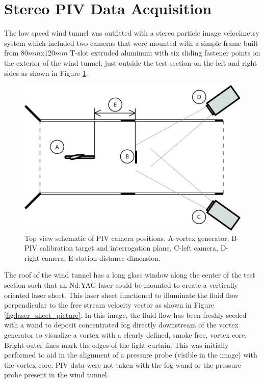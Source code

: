 

\section{Stereo PIV Data Acquisition}

The low speed wind tunnel was outfitted with a stereo particle image 
velocimetry system which included two cameras that were mounted with a simple 
frame built from 80$mm$x120$mm$ T-slot extruded aluminum with six sliding 
fastener points on the exterior of the wind tunnel, just outside the test 
section on the left and right sides as shown in Figure \ref{fig:pivsetup}. 

\vspace{32pt}
\begin{figure}[H]
	\centering
	\includegraphics[width=5in]{figs/piv_method/piv_camera_diagram}
	\caption{Top view schematic of PIV camera positions. A-vortex generator, 
	B-PIV 
		calibration target and interrogation plane, C-left camera, D-right 
		camera, E-station distance dimension.}
	\label{fig:pivsetup}
\end{figure}

The roof of the wind tunnel has a long glass window along the center of the 
test section such that an Nd:YAG laser could be mounted to create a vertically 
oriented laser sheet. This laser sheet functioned to illuminate the fluid flow 
perpendicular to the free stream velocity vector as 
shown in Figure \ref{fig:laser_sheet_picture}. In this image, the fluid flow 
has been freshly seeded with a wand to deposit concentrated fog directly 
downstream of the vortex generator to visualize a vortex with a clearly 
defined, smoke free, vortex core. Bright outer lines mark the edges of the 
light curtain. This was initially performed to aid in the alignment of a 
pressure probe (visible in the image) with the vortex core. PIV data were not 
taken with the fog wand or the pressure probe present in the wind tunnel.


